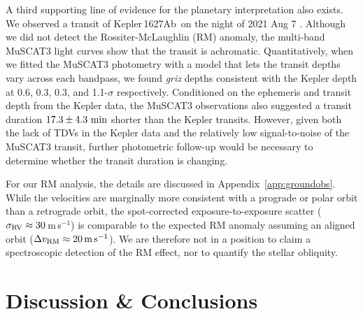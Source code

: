 \documentclass[12pt,modern,twocolumn,tighten,linenumbers]{aastex63}
\newcommand{\pn}{Kepler\,1627Ab} %
\newcommand{\ms}{\,m\,s$^{-1}$}
\begin{document}
A third supporting line of evidence for the planetary interpretation
also exists.  We observed a transit of \pn\ on the
night of 2021 Aug 7 .    Although we did not detect the
Rossiter-McLaughlin (RM) anomaly, the multi-band MuSCAT3 light curves
show that the transit is achromatic.
Quantitatively, when we fitted the MuSCAT3
photometry with a model that lets the transit depths vary across each
bandpass, we found {\it griz} depths consistent with the Kepler depth
at 0.6, 0.3, 0.3, and 1.1-$\sigma$ respectively.    Conditioned on the
ephemeris and transit depth from the Kepler data, the MuSCAT3 observations also
suggested a transit duration $17.3\pm4.3\ {\rm min}$ shorter than the
Kepler transits.
However, given both the lack of TDVs in the Kepler data
and the relatively low signal-to-noise of the MuSCAT3 transit,
further photometric follow-up would be necessary to determine
whether the transit duration is  changing.  

For our RM analysis,
the details are discussed in Appendix~\ref{app:groundobs}.  While the
velocities are marginally more consistent with a prograde or polar
orbit than a retrograde orbit, the spot-corrected exposure-to-exposure
scatter ($\sigma_{\rm RV}\approx 30$\ms) is comparable to the expected
RM anomaly assuming an aligned orbit ($\Delta v_{\rm RM}\approx
20\,{\rm m\,s}^{-1}$).  We are therefore not in a position to claim a
spectroscopic detection of the RM effect, nor to quantify the stellar
obliquity.


\section{Discussion \& Conclusions}
\label{sec:conc}
\end{document}
